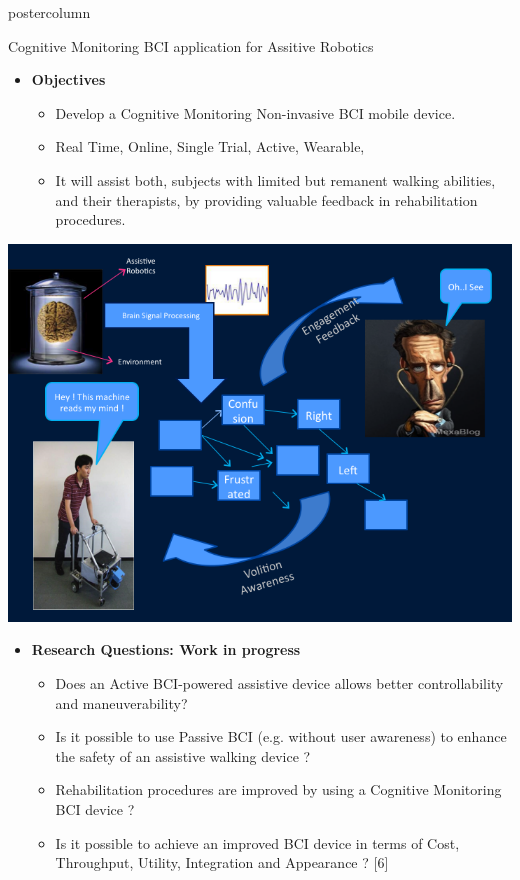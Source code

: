 \documentclass[final]{beamer}
\begin{document}
\begin{frame}
\begin{columns}
\begin{column}{.49\textwidth}
\begin{beamercolorbox}[center,wd=\textwidth]{postercolumn}
\begin{minipage}[T]{.95\textwidth}
{             \begin{block}{Cognitive Monitoring BCI application for Assitive Robotics}
               \begin{itemize}
              \item \textbf{Objectives}
                \begin{itemize}
                \item Develop a Cognitive Monitoring Non-invasive BCI mobile device.
                \item Real Time, Online, Single Trial, Active, Wearable, 
                \item It will assist both, subjects with limited but remanent walking abilities, and their therapists, by providing valuable feedback in rehabilitation procedures.
                \end{itemize}
              \end{itemize} 
              
		\centering
                \includegraphics[width=0.90\linewidth]{images/viola/objective}

              \begin{itemize}
              \item \textbf{Research Questions: Work in progress }
                \begin{itemize}
                \item Does an Active BCI-powered assistive device allows better controllability and maneuverability?
                \item Is it possible to use Passive BCI (e.g. without user awareness) to enhance the safety of an assistive walking device ?
                \item Rehabilitation procedures are improved by using a Cognitive Monitoring BCI device ?  
                \item Is it possible to achieve an improved BCI device in terms of Cost, Throughput, Utility, Integration and Appearance ? [6]             
                \end{itemize}
              \end{itemize} 			  


\end{block}}
\end{minipage}
\end{beamercolorbox}
\end{column}
\end{columns}
\end{frame}
\end{document}
